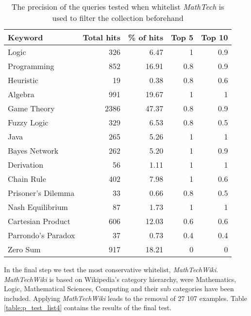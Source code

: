 \begin{table}[h]
\centering
\small
\begin{tabular} {|| p{10em} | r | r | r | r ||} 
 \hline
 Keyword & Total hits & \% of hits & Top 5 & Top 10 \\ [0.5ex] 
 \hline

Logic & 326 & 6.47 & 1 & 0.9 \\
Programming & 852 & 16.91 & 0.8 & 0.9 \\
Heuristic & 19 & 0.38 & 0.8 & 0.6 \\
Algebra & 991 & 19.67 & 1 & 1 \\
Game Theory & 2386 & 47.37 & 0.8 & 0.9 \\
\hline
Fuzzy Logic & 329 & 6.53 & 0.8 & 0.5 \\
Java & 265 & 5.26 & 1 & 1 \\
Bayes Network & 262 & 5.20 & 1 & 0.9 \\
Derivation & 56 & 1.11 & 1 & 1 \\
\hline
Chain Rule & 402 & 7.98 & 1 & 0.6 \\
Prisoner's Dilemma & 33 & 0.66 & 0.8 & 0.5 \\
Nash Equilibrium & 87 & 1.73 & 1 & 1 \\
Cartesian Product & 606 & 12.03 & 0.6 & 0.6 \\
Parrondo's Paradox & 37 & 0.73 & 0.4 & 0.4 \\
Zero Sum & 917 & 18.21 & 0 & 0 \\

 \hline
\end{tabular}
\caption{The precision of the queries tested when whitelist \textit{MathTech} is used to filter the collection beforehand}
\label{table:p_test_list3}
\end{table}
\clearpage

In the final step we test the most conservative whitelist, \textit{MathTechWiki}. \textit{MathTechWiki} is based on Wikipedia's category hierarchy, were Mathematics, Logic, Mathematical Sciences, Computing and their sub categories have been included. Applying \textit{MathTechWiki} leads to the removal of 27 107 examples. Table \ref{table:p_test_list4} contains the results of the final test. 

